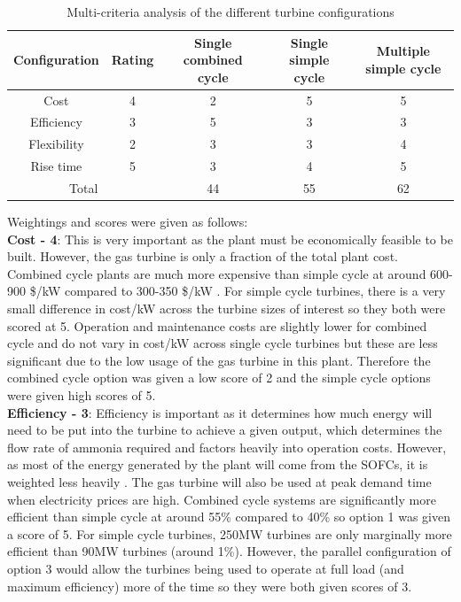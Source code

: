 \documentclass[11pt, oneside]{article}
\begin{document}
\begin {table} [h]
\begin{center}
\caption{Multi-criteria analysis of the different turbine configurations} \label{tab:MCA} 
\begin{tabular}{ |c|c|c|c|c| }
 \hline
  Configuration & Rating & Single combined cycle & Single simple cycle & Multiple simple cycle\\ 
 \hline
  Cost & 4 & 2 & 5 & 5 \\ 
 \hline
  Efficiency & 3 & 5 & 3 & 3\\ 
 \hline
  Flexibility & 2 & 3 & 3 & 4\\
 \hline
  Rise time & 5 & 3 & 4 & 5\\
   \hline
   \multicolumn{2}{|c|}{Total}  & 44 & 55 & 62 \\
 \hline
\end{tabular}
\end{center}  
\end {table}
Weightings and scores were given as follows: 
\\\textbf{Cost - 4}: This is very important as the plant must be economically feasible to be built. However, the gas turbine is only a fraction of the total plant cost. Combined cycle plants are much more expensive than simple cycle at around 600-900 \$/kW compared to 300-350 \$/kW \cite{turbinecost}. For simple cycle turbines, there is a very small difference in cost/kW across the turbine sizes of interest so they both were scored at 5. Operation and maintenance costs are slightly lower for combined cycle and do not vary in cost/kW across single cycle turbines but these are less significant due to the low usage of the gas turbine in this plant. \cite{boyce} Therefore the combined cycle option was given a low score of 2 and the simple cycle options were given high scores of 5.
\\\textbf{Efficiency - 3}: Efficiency is important as it determines how much energy will need to be put into the turbine to achieve a given output, which determines the flow rate of ammonia required and factors heavily into operation costs. However, as most of the energy generated by the plant will come from the SOFCs, it is weighted less heavily . The gas turbine will also be used at peak demand time when electricity prices are high. Combined cycle systems are significantly more efficient than simple cycle at around 55\% compared to 40\% so option 1 was given a score of 5. For simple cycle turbines, 250MW turbines are only marginally more efficient than 90MW turbines (around 1\%). However, the parallel configuration of option 3 would allow the turbines being used to operate at full load (and maximum efficiency) more of the time so they were both given scores of 3. 
\end{document}
